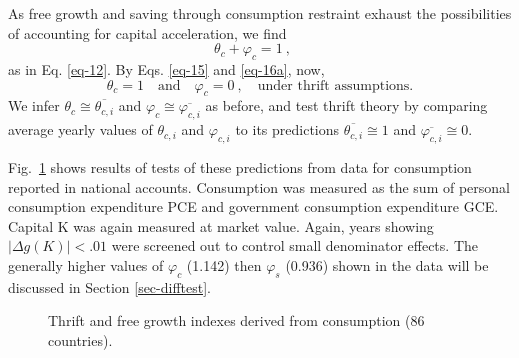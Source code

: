 \documentclass[a4paper,fleqn]{latex_styles/cas-sc}
\begin{document}
As free growth and saving through consumption restraint exhaust the possibilities of accounting for capital acceleration, we find
%
\begin{equation}
    \theta_c + \varphi_c = 1 \ , \quad
    \label{eq-16}
\end{equation}
as in Eq. \eqref{eq-12}. By Eqs. \eqref{eq-15} and \eqref{eq-16a}, now,
\begin{equation}
    \theta_c = 1 \quad \text{and} \quad \varphi_c = 0 \ , \quad \text{under thrift assumptions.}
    \label{eq-17}
\end{equation}
We infer \(\theta_c \cong \overline{\theta_{c,i}}\) and \(\varphi_c \cong \overline{\varphi_{c,i}}\) as before, and test thrift theory by comparing average yearly values of $\theta_{c,i}$ and $\varphi_{c,i}$ to its predictions $\overline{\theta_{c,i}} \cong 1$ and $\overline{\varphi_{c,i}} \cong 0$.

Fig.~\ref{fig-c_plots} shows results of tests of these predictions from
data for consumption reported in national accounts. Consumption was
measured as the sum of personal consumption expenditure PCE and
government consumption expenditure GCE. Capital K was again measured at
market value. Again, years showing \(|\Delta g(K)| < .01\) were screened
out to control small denominator effects. 
The generally higher values of \(\varphi_c\) (1.142) then \(\varphi_s\) (0.936) shown in the data will be discussed in Section \ref{sec-difftest}.  

\begin{figure}[pos=H]
    \centering
    \quad %
    \captionsetup{justification=centering}
    \caption{Thrift and free growth indexes derived from consumption (86 countries).}
    \label{fig-c_plots}
\end{figure}
\end{document}
